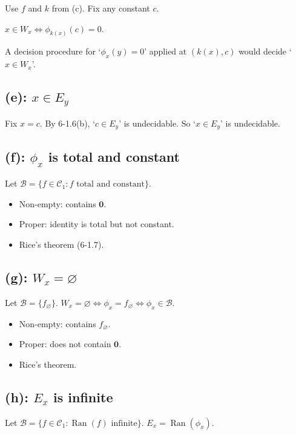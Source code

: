 \documentclass[fleqn]{article}
\begin{document}
Use $f$ and $k$ from (c). Fix any constant $c$.

$x \in W_x \iff \phi_{k(x)}(c) = 0$.

A decision procedure for `$\phi_x(y) = 0$' applied at $(k(x), c)$ would decide `$x \in W_x$'.

\subsection*{(e): $x \in E_y$}

Fix $x = c$. By 6-1.6(b), `$c \in E_y$' is undecidable. So `$x \in E_y$' is undecidable.

\subsection*{(f): $\phi_x$ is total and constant}

Let $\mathscr{B} = \{ f \in \mathscr{C}_1 : f \text{ total and constant} \}$.

\begin{itemize}
\item Non-empty: contains $\mathbf{0}$.
\item Proper: identity is total but not constant.
\item Rice's theorem (6-1.7).
\end{itemize}

\subsection*{(g): $W_x = \varnothing$}

Let $\mathscr{B} = \{ f_\varnothing \}$. $W_x = \varnothing \iff \phi_x = f_\varnothing \iff \phi_x \in \mathscr{B}$.

\begin{itemize}
\item Non-empty: contains $f_\varnothing$.
\item Proper: does not contain $\mathbf{0}$.
\item Rice's theorem.
\end{itemize}

\subsection*{(h): $E_x$ is infinite}

Let $\mathscr{B} = \{ f \in \mathscr{C}_1 : \operatorname{Ran}(f) \text{ infinite} \}$. $E_x = \operatorname{Ran}(\phi_x)$.
\end{document}
